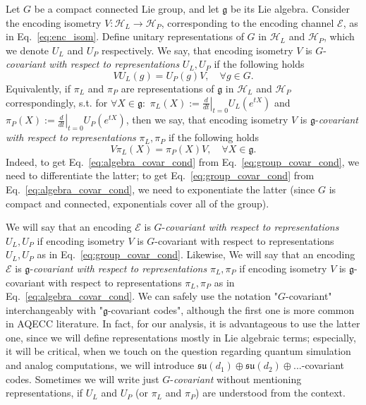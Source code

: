 \documentclass[10pt,twocolumn,superscriptaddress,aps,amsmath,amssymb,citeautoscript,floatfix,prx,longbibliography]{revtex4-2}
\newcounter{alg}
\theoremstyle{plain}
\theoremstyle{plain}
\theoremstyle{plain}
\theoremstyle{plain}
\theoremstyle{plain}
\theoremstyle{plain}
\begin{document}
Let $G$ be a compact connected Lie group, and let $\mathfrak{g}$ be its Lie algebra. Consider the encoding isometry $V: \mathcal{H}_L \to \mathcal{H}_P$, corresponding to the encoding channel $\mathcal{E}$, as in Eq.~\eqref{eq:enc_isom}. Define unitary representations of $G$ in $\mathcal{H}_L$ and $\mathcal{H}_P$, which we denote $U_L$ and $U_P$ respectively. We say, that encoding isometry $V$ is $G$-\textit{covariant with respect to representations} $U_L, U_P$ if the following holds
\begin{equation}\label{eq:group_covar_cond}
    V  U_L(g) = U_P(g)  V, \quad \forall g\in G.
\end{equation}
Equivalently, if $\pi_L$ and $\pi_P$ are representations of $\mathfrak{g}$ in $\mathcal{H}_L$ and $\mathcal{H}_P$ correspondingly, s.t. for $\forall X\in \mathfrak{g}:$ $\pi_L(X):=\left.\frac{d}{d t}\right|_{t=0} U_L\left(e^{t X}\right)$ and $\pi_P(X):=\left.\frac{d}{d t}\right|_{t=0} U_P\left(e^{t X}\right)$, then we say, that encoding isometry $V$ is $\mathfrak{g}$-\textit{covariant with respect to representations} $\pi_L, \pi_P$ if the following holds
\begin{equation}\label{eq:algebra_covar_cond}
    V \pi_L(X) = \pi_P(X) V, \quad \forall X\in \mathfrak{g}.
\end{equation}
Indeed, to get Eq.~\eqref{eq:algebra_covar_cond} from Eq.~\eqref{eq:group_covar_cond}, we need to differentiate the latter; to get Eq.~\eqref{eq:group_covar_cond} from Eq.~\eqref{eq:algebra_covar_cond}, we need to exponentiate the latter (since $G$ is compact and connected, exponentials cover all of the group). 

We will say that an encoding $\mathcal{E}$ is $G$-\textit{covariant with respect to representations} $U_L, U_P$ if encoding isometry $V$ is $G$-covariant with respect to representations $U_L, U_P$ as in Eq.~\eqref{eq:group_covar_cond}. Likewise, We will say that an encoding $\mathcal{E}$ is $\mathfrak{g}$-\textit{covariant with respect to representations} $\pi_L, \pi_P$ if encoding isometry $V$ is $\mathfrak{g}$-covariant with respect to representations $\pi_L, \pi_P$ as in Eq.~\eqref{eq:algebra_covar_cond}. We can safely use the notation "$G$-covariant" interchangeably with "$\mathfrak{g}$-covariant codes", although the first one is more common in AQECC literature. In fact, for our analysis, it is advantageous to use the latter one, since we will define representations mostly in Lie algebraic terms; especially, it will be critical, when we touch on the question regarding quantum simulation and analog computations, we will introduce $\mathfrak{su}(d_1)\oplus\mathfrak{su}(d_2)\oplus...$-covariant codes. Sometimes we will write just $G$-\textit{covariant} without mentioning representations, if $U_L$ and $U_P$ (or $\pi_L$ and $\pi_P$) are understood from the context.
\end{document}
